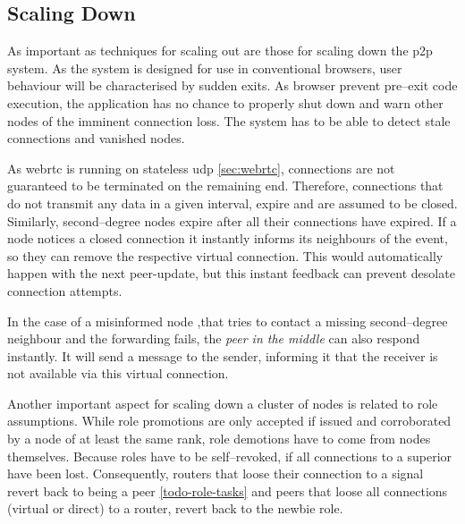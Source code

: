 \subsection{Scaling Down}
As important as techniques for scaling out are those for scaling down the \gls{p2p} system. As the system is designed for use in conventional browsers, user behaviour will be characterised by sudden exits. As browser prevent pre–exit code execution, the application has no chance to properly shut down and warn other nodes of the imminent connection loss. The system has to be able to detect stale connections and vanished nodes.

As \gls{webrtc} is running on stateless \gls{udp} \cref{sec:webrtc}, connections are not guaranteed to be terminated on the remaining end.
Therefore, connections that do not transmit any data in a given interval, expire and are assumed to be closed. Similarly, second–degree nodes expire after all their connections have expired.
If a node notices a closed connection it instantly informs its neighbours of the event, so they can remove the respective virtual connection. This would automatically happen with the next \gls{peer-update}, but this instant feedback can prevent desolate connection attempts.

In the case of a misinformed node ,that tries to contact a missing second–degree neighbour and the forwarding fails, the \textit{peer in the middle} can also respond instantly. It will send a message to the sender, informing it that the receiver is not available via this virtual connection.

Another important aspect for scaling down a cluster of nodes is related to role assumptions. While role promotions are only accepted if issued and corroborated by a node of at least the same rank, role demotions have to come from nodes themselves.
Because roles have to be self–revoked, if all connections to a superior have been lost. Consequently, routers that loose their connection to a signal revert back to being a peer \ref{todo-role-tasks} and peers that loose all connections (virtual or direct) to a router, revert back to the newbie role.
